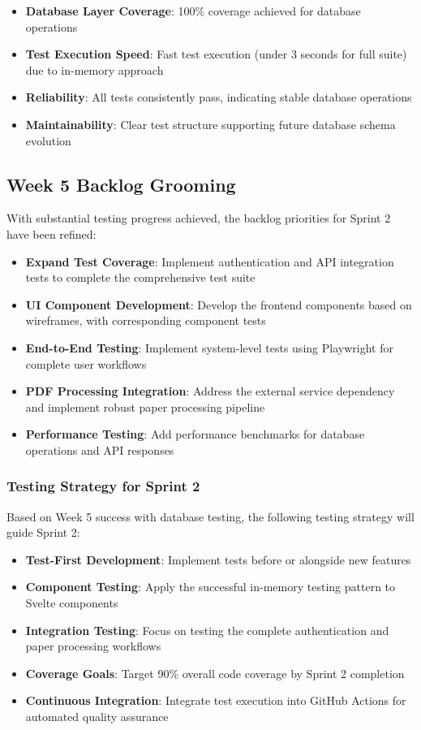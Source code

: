 \documentclass[12pt]{article}
\begin{document}
\begin{itemize}
  \item \textbf{Database Layer Coverage}: 100\% coverage achieved for database operations
  \item \textbf{Test Execution Speed}: Fast test execution (under 3 seconds for full suite) due to in-memory approach
  \item \textbf{Reliability}: All tests consistently pass, indicating stable database operations
  \item \textbf{Maintainability}: Clear test structure supporting future database schema evolution
\end{itemize}

\subsection{Week 5 Backlog Grooming}
With substantial testing progress achieved, the backlog priorities for Sprint 2 have been refined:

\begin{itemize}
  \item \textbf{Expand Test Coverage}: Implement authentication and API integration tests to complete the comprehensive test suite
  \item \textbf{UI Component Development}: Develop the frontend components based on wireframes, with corresponding component tests
  \item \textbf{End-to-End Testing}: Implement system-level tests using Playwright for complete user workflows
  \item \textbf{PDF Processing Integration}: Address the external service dependency and implement robust paper processing pipeline
  \item \textbf{Performance Testing}: Add performance benchmarks for database operations and API responses
\end{itemize}

\subsubsection{Testing Strategy for Sprint 2}
Based on Week 5 success with database testing, the following testing strategy will guide Sprint 2:

\begin{itemize}
  \item \textbf{Test-First Development}: Implement tests before or alongside new features
  \item \textbf{Component Testing}: Apply the successful in-memory testing pattern to Svelte components
  \item \textbf{Integration Testing}: Focus on testing the complete authentication and paper processing workflows
  \item \textbf{Coverage Goals}: Target 90\% overall code coverage by Sprint 2 completion
  \item \textbf{Continuous Integration}: Integrate test execution into GitHub Actions for automated quality assurance
\end{itemize}
\end{document}
